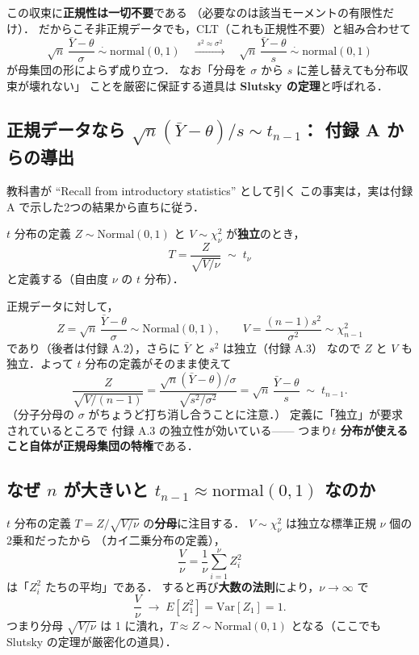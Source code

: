 \documentclass[lualatex,ja=standard,a4paper,12pt]{bxjsarticle}
\begin{document}
\begin{pointbox}
この収束に\textbf{正規性は一切不要}である
（必要なのは該当モーメントの有限性だけ）．
だからこそ非正規データでも，CLT（これも正規性不要）と組み合わせて
\[
  \sqrt{n}\,\frac{\bar{Y} - \theta}{\sigma}
  \;\overset{\cdot}{\sim}\; \mathrm{normal}(0,1)
  \quad\xrightarrow{\;s^2 \approx \sigma^2\;}\quad
  \sqrt{n}\,\frac{\bar{Y} - \theta}{s}
  \;\overset{\cdot}{\sim}\; \mathrm{normal}(0,1)
\]
が母集団の形によらず成り立つ．
なお「分母を $\sigma$ から $s$ に差し替えても分布収束が壊れない」
ことを厳密に保証する道具は \textbf{Slutsky の定理}と呼ばれる．
\end{pointbox}

\subsection{正規データなら $\sqrt{n}(\bar{Y}-\theta)/s \sim t_{n-1}$：
付録 A からの導出}

教科書が ``Recall from introductory statistics'' として引く
この事実は，実は付録 A で示した2つの結果から直ちに従う．

\begin{defbox}{$t$ 分布の定義}
$Z \sim \mathrm{Normal}(0,1)$ と $V \sim \chi^2_\nu$ が\textbf{独立}のとき，
\[
  T = \frac{Z}{\sqrt{V/\nu}} \;\sim\; t_\nu
\]
と定義する（自由度 $\nu$ の $t$ 分布）．
\end{defbox}

正規データに対して，
\[
  Z = \sqrt{n}\,\frac{\bar{Y}-\theta}{\sigma} \sim \mathrm{Normal}(0,1),
  \qquad
  V = \frac{(n-1)s^2}{\sigma^2} \sim \chi^2_{n-1}
\]
であり（後者は付録 A.2），さらに $\bar{Y}$ と $s^2$ は独立（付録 A.3）
なので $Z$ と $V$ も独立．よって $t$ 分布の定義がそのまま使えて
\[
  \frac{Z}{\sqrt{V/(n-1)}}
  = \frac{\sqrt{n}(\bar{Y}-\theta)/\sigma}{\sqrt{s^2/\sigma^2}}
  = \sqrt{n}\,\frac{\bar{Y}-\theta}{s}
  \;\sim\; t_{n-1}.
\]
（分子分母の $\sigma$ がちょうど打ち消し合うことに注意．）
定義に「独立」が要求されているところで
付録 A.3 の独立性が効いている——
つまり\textbf{$t$ 分布が使えること自体が正規母集団の特権}である．

\subsection{なぜ $n$ が大きいと $t_{n-1} \approx \mathrm{normal}(0,1)$ なのか}

$t$ 分布の定義 $T = Z / \sqrt{V/\nu}$ の\textbf{分母}に注目する．
$V \sim \chi^2_\nu$ は独立な標準正規 $\nu$ 個の2乗和だったから
（カイ二乗分布の定義），
\[
  \frac{V}{\nu} = \frac{1}{\nu}\sum_{i=1}^\nu Z_i^2
\]
は「$Z_i^2$ たちの平均」である．
すると再び\textbf{大数の法則}により，$\nu \to \infty$ で
\[
  \frac{V}{\nu} \;\longrightarrow\; E[Z_1^2] = \mathrm{Var}[Z_1] = 1.
\]
つまり分母 $\sqrt{V/\nu}$ は 1 に潰れ，$T \approx Z \sim \mathrm{Normal}(0,1)$
となる（ここでも Slutsky の定理が厳密化の道具）．
\end{document}
